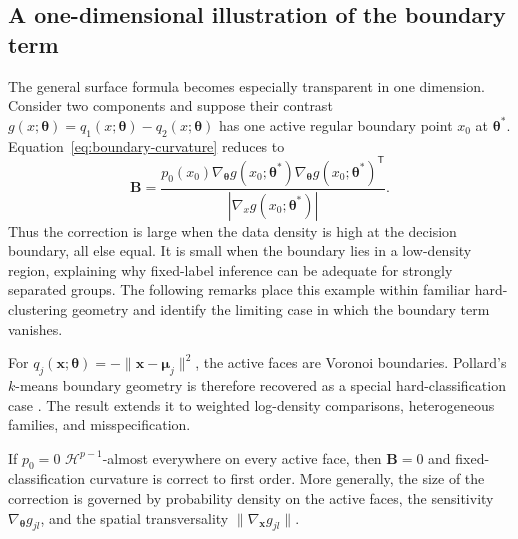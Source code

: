 \subsection{A one-dimensional illustration of the boundary term}
\label{sec:one-dimensional-illustration}
The general surface formula becomes especially transparent in one dimension.
Consider two components and suppose their contrast
$g(x;\boldsymbol{\theta})=q_1(x;\boldsymbol{\theta})-
q_2(x;\boldsymbol{\theta})$ has one active regular boundary point $x_0$ at
$\boldsymbol{\theta}^*$.  Equation~\eqref{eq:boundary-curvature} reduces to
\begin{equation}
 \mathbf B=\frac{p_0(x_0)\nabla_{\boldsymbol\theta}g(x_0;\boldsymbol\theta^*)
 \nabla_{\boldsymbol\theta}g(x_0;\boldsymbol\theta^*)^\mathsf T}
 {|\nabla_x g(x_0;\boldsymbol\theta^*)|}.
 \label{eq:one-dimensional-boundary}
\end{equation}
Thus the correction is large when the data density is high at the decision
boundary, all else equal. It is small when the boundary lies in a low-density
region, explaining why fixed-label inference can be adequate for strongly
separated groups. The following remarks place this example within familiar
hard-clustering geometry and identify the limiting case in which the boundary
term vanishes.

\begin{remark}
\label{rem:kmeans}
For $q_j(\mathbf{x};\boldsymbol{\theta})=-\|\mathbf{x}-
\boldsymbol{\mu}_j\|^2$, the active faces are Voronoi boundaries.  Pollard's
$k$-means boundary geometry is therefore recovered as a special
hard-classification case \citep{pollard1982clt}.  The result extends it to
weighted log-density comparisons, heterogeneous families, and misspecification.
\end{remark}

\begin{corollary}
\label{cor:negligible-boundary}
If $p_0=0$ $\mathcal H^{p-1}$-almost everywhere on every active face, then
$\mathbf{B}=0$ and fixed-classification curvature is correct to first order.
More generally, the size of the correction is governed by probability density
on the active faces, the sensitivity $\nabla_{\boldsymbol{\theta}}g_{jl}$, and the spatial
transversality $\|\nabla_{\mathbf{x}}g_{jl}\|$.
\end{corollary}
